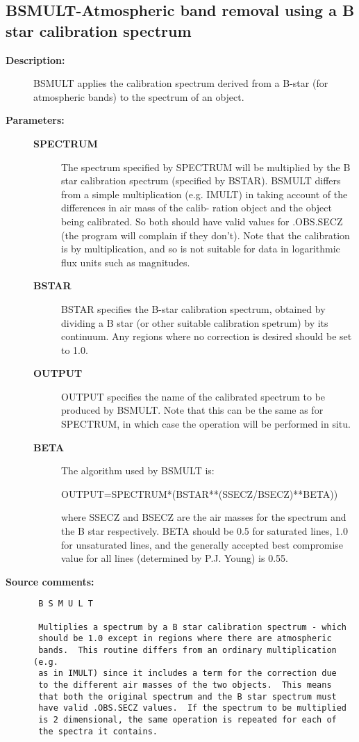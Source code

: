 \subsection{BSMULT-\label{BSMULT}Atmospheric band removal using a B star calibration spectrum}
\begin{description}

\item [{\bf Description:}]
 BSMULT applies the calibration spectrum derived from a B-star
 (for atmospheric bands) to the spectrum of an object.

\item [{\bf Parameters:}]
\begin{description}
\item [{\bf SPECTRUM}]
 The spectrum specified by SPECTRUM will be multiplied
 by the B star calibration spectrum (specified by BSTAR).
 BSMULT differs from a simple multiplication (e.g. IMULT) in
 taking account of the differences in air mass of the calib-
 ration object and the object being calibrated.  So both
 should  have valid values for .OBS.SECZ (the program will
 complain if they don't).  Note that the calibration is by
 multiplication, and so is not suitable for data in
 logarithmic flux units such as magnitudes.
\item [{\bf BSTAR}]
 BSTAR specifies the B-star calibration spectrum, obtained
 by dividing a B star (or other suitable calibration spetrum)
 by its continuum.  Any regions where no correction is
 desired should be set to 1.0.
\item [{\bf OUTPUT}]
 OUTPUT specifies the name of the calibrated spectrum to be
 produced by BSMULT.  Note that this can be the same as for
 SPECTRUM, in which case the operation will be performed in
 situ.
\item [{\bf BETA}]
 The algorithm used by BSMULT is:

    OUTPUT=SPECTRUM*(BSTAR**(SSECZ/BSECZ)**BETA))

 where SSECZ and BSECZ are the air masses for the
 spectrum and the B star respectively.  BETA should
 be 0.5 for saturated lines, 1.0 for unsaturated lines,
 and the generally accepted best compromise value for
 all lines (determined by P.J. Young) is 0.55.
\end{description}

\item [{\bf Source comments:}]
\begin{verbatim}
 B S M U L T

 Multiplies a spectrum by a B star calibration spectrum - which
 should be 1.0 except in regions where there are atmospheric
 bands.  This routine differs from an ordinary multiplication (e.g.
 as in IMULT) since it includes a term for the correction due
 to the different air masses of the two objects.  This means
 that both the original spectrum and the B star spectrum must
 have valid .OBS.SECZ values.  If the spectrum to be multiplied
 is 2 dimensional, the same operation is repeated for each of
 the spectra it contains.


\end{verbatim}
\end{description}

